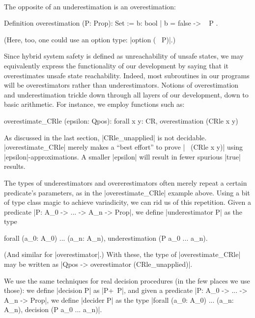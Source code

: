 \documentclass[runningheads]{llncs}
\begin{document}
\

\noindent The opposite of an underestimation is an overestimation:
\begin{code}
Definition overestimation (P: Prop): Set := { b: bool | b = false -> ~ P }.
\end{code}
(Here, too, one could use an option type: |option (~ P)|.)

Since hybrid system safety is defined as unreachability of unsafe states, we may equivalently express the functionality of our development by saying that it overestimates unsafe state reachability. Indeed, most subroutines in our programs will be overestimators rather than underestimators. Notions of overestimation and underestimation trickle down through all layers of our development, down to basic arithmetic. For instance, we employ functions such as:



\begin{code}
overestimate_CRle (epsilon: Qpos): forall x y: CR, overestimation (CRle x y)
\end{code}
As discussed in the last section, |CRle_unapplied| is not decidable. |overestimate_CRle| merely makes a ``best effort'' to prove |~ (CRle x y)| using |epsilon|-approximations. A smaller |epsilon| will result in fewer spurious |true| results.



The types of underestimators and overerestimators often merely repeat a certain predicate's parameters, as in the |overestimate_CRle| example above. Using a bit of type class magic to achieve variadicity, we can rid us of this repetition. Given a predicate |P: A_0 -> ... -> A_n -> Prop|, we define |underestimator P| as the type \begin{code}forall (a_0: A_0) ... (a_n: A_n), underestimation (P a_0 ... a_n).\end{code} (And similar for |overestimator|.) With these, the type of |overestimate_CRle| may be written as |Qpos -> overestimator (CRle_unapplied)|.

We use the same techniques for real decision procedures (in the few places we use those): we define |decision P| as |{P}+{~P}|, and given a predicate |P: A_0 -> ... -> A_n -> Prop|, we define |decider P| as the type |forall (a_0: A_0) ... (a_n: A_n), decision (P a_0 ... a_n)|.
\end{document}
